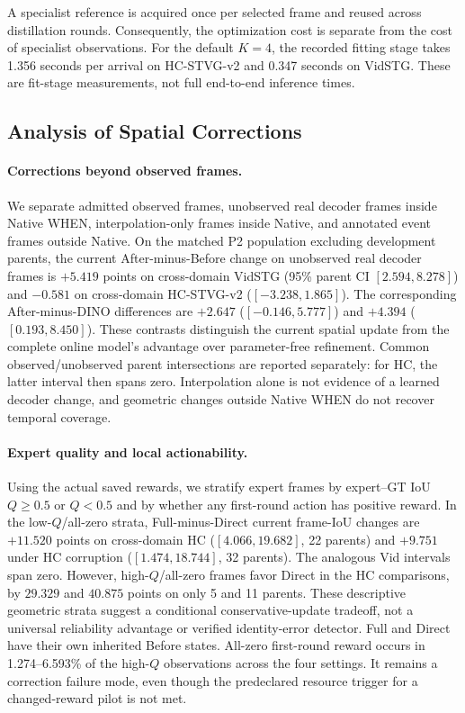 \documentclass[10pt,twocolumn,letterpaper]{article}
\begin{document}
A specialist reference is acquired once per selected
frame and reused across distillation rounds. Consequently,
the optimization cost is separate from the cost of
specialist observations. For the default $K=4$, the
recorded fitting stage takes 1.356 seconds per arrival
on HC-STVG-v2 and 0.347 seconds on VidSTG. These are
fit-stage measurements, not full end-to-end inference
times.

\subsection{Analysis of Spatial Corrections}
\label{sec:correction-analysis}

\paragraph{Corrections beyond observed frames.}
We separate admitted observed frames, unobserved real decoder frames
inside Native WHEN, interpolation-only frames inside Native, and
annotated event frames outside Native. On the matched P2 population
excluding development parents, the current After-minus-Before change
on unobserved real decoder frames is $+5.419$ points on cross-domain
VidSTG (95\% parent CI $[2.594,8.278]$) and $-0.581$ on
cross-domain HC-STVG-v2 ($[-3.238,1.865]$). The corresponding
After-minus-DINO differences are $+2.647$ ($[-0.146,5.777]$)
and $+4.394$ ($[0.193,8.450]$). These contrasts distinguish the
current spatial update from the complete online model's advantage
over parameter-free refinement. Common observed/unobserved parent
intersections are reported separately: for HC, the latter interval
then spans zero. Interpolation alone is not evidence of a learned
decoder change, and geometric changes outside Native WHEN do not
recover temporal coverage.

\paragraph{Expert quality and local actionability.}
Using the actual saved rewards, we stratify expert frames by
expert--GT IoU $Q\geq0.5$ or $Q<0.5$ and by whether any first-round
action has positive reward. In the low-$Q$/all-zero strata,
Full-minus-Direct current frame-IoU changes are $+11.520$ points
on cross-domain HC ($[4.066,19.682]$, 22 parents) and $+9.751$
under HC corruption ($[1.474,18.744]$, 32 parents). The analogous
Vid intervals span zero. However, high-$Q$/all-zero frames favor
Direct in the HC comparisons, by $29.329$ and $40.875$ points on
only 5 and 11 parents. These descriptive geometric strata suggest
a conditional conservative-update tradeoff, not a universal
reliability advantage or verified identity-error detector.
Full and Direct have their own inherited Before states.
All-zero first-round reward occurs in 1.274--6.593\% of the
high-$Q$ observations across the four settings. It remains a
correction failure mode, even though the predeclared resource
trigger for a changed-reward pilot is not met.
\end{document}
